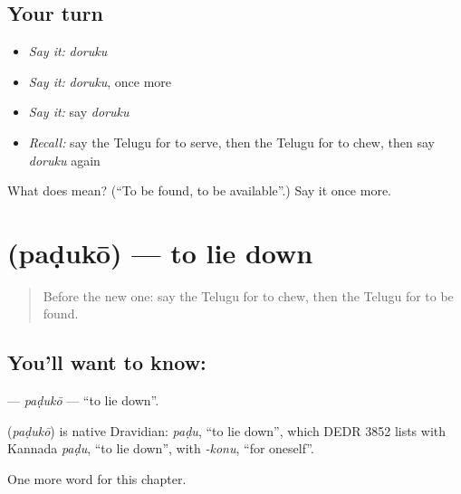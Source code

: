 \subsection*{Your turn}
\begin{itemize}
\raggedright
  \item \emph{Say it:} \emph{doruku}
  \item \emph{Say it:} \emph{doruku}, once more
  \item \emph{Say it:} say \emph{doruku}
  \item \emph{Recall:} say the Telugu for to serve, then the Telugu for to chew, then say \emph{doruku} again
\end{itemize}

\begin{tcolorbox}[breakable,colback=teal!4,colframe=teal!35!black,title={Before you move on}]
What does  mean? (\textquotedblleft{}To be found, to be available\textquotedblright{}.) Say it once more.
\end{tcolorbox}
\section[\texorpdfstring{\te{పడుకో} (paḍukō)}{పడుకో (paḍukō)}]{ (paḍukō) — to lie down}

\label{lesson:TE-C201-paduko}



\begin{quote}
Before the new one: say the Telugu for to chew, then the Telugu for to be found.
\end{quote}

\subsection*{You'll want to know: }
\textbf{} — \emph{paḍukō} — \textquotedblleft{}to lie down\textquotedblright{}.

\begin{cousinweb}
\textbf{} (\emph{paḍukō}) is native Dravidian: \emph{paḍu}, \textquotedblleft{}to lie down\textquotedblright{}, which DEDR 3852 lists with Kannada \emph{paḍu}, \textquotedblleft{}to lie down\textquotedblright{}, with \emph{-konu}, \textquotedblleft{}for oneself\textquotedblright{}.
\end{cousinweb}

\begin{grammarlens}[title={What you've built}]
One more word for this chapter.
\end{grammarlens}

